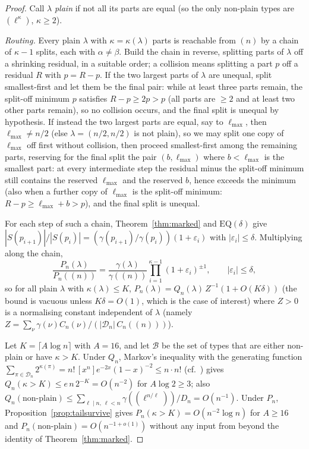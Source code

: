 \documentclass[11pt]{article}
\theoremstyle{definition}
\newcommand{\DD}{\mathcal{D}}
\newcommand{\PP}{P}
\newcommand{\QQ}{Q}
\newcommand{\CC}{C}
\begin{document}
\begin{proof}
Call $\lambda$ \emph{plain} if not all its parts are equal (so the only
non-plain types are $(\ell^{\kappa})$, $\kappa\ge2$).

\emph{Routing.}  Every plain $\lambda$ with $\kappa=\kappa(\lambda)$ parts is
reachable from $(n)$ by a chain of $\kappa-1$ splits, each with
$\alpha\ne\beta$.  Build the chain in reverse, splitting parts of $\lambda$
off a shrinking residual, in a suitable order; a collision means splitting a
part $p$ off a residual $R$ with $p=R-p$.  If the two largest parts of
$\lambda$ are unequal, split smallest-first and let them be the final pair:
while at least three parts remain, the split-off minimum $p$ satisfies
$R-p\ge2p>p$ (all parts are $\ge2$ and at least two other parts remain), so
no collision occurs, and the final split is unequal by hypothesis.  If
instead the two largest parts are equal, say to $\ell_{\max}$, then
$\ell_{\max}\neq n/2$ (else $\lambda=(n/2,n/2)$ is not plain), so we may
split one copy of $\ell_{\max}$ off first without collision, then proceed
smallest-first among the remaining parts, reserving for the final split the
pair $(b,\ell_{\max})$ where $b<\ell_{\max}$ is the smallest part: at every
intermediate step the residual minus the split-off minimum still contains
the reserved $\ell_{\max}$ and the reserved $b$, hence exceeds the
minimum (also when a further copy of $\ell_{\max}$ is the split-off
minimum: $R-p\ge\ell_{\max}+b>p$), and the final split is unequal.

For each step of such a chain, Theorem~\ref{thm:marked} and
$\mathrm{EQ}(\delta)$ give
$|S(p_{i+1})|/|S(p_i)|=(\gamma(p_{i+1})/\gamma(p_i))(1+\varepsilon_i)$ with
$|\varepsilon_i|\le\delta$.  Multiplying along the chain,
\[
\frac{\PP_n(\lambda)}{\PP_n((n))}
=\frac{\gamma(\lambda)}{\gamma((n))}\prod_{i=1}^{\kappa-1}(1+\varepsilon_i)^{\pm1},
\qquad |\varepsilon_i|\le\delta,
\]
so for all plain $\lambda$ with $\kappa(\lambda)\le K$,
$\PP_n(\lambda)=\QQ_n(\lambda)\,Z^{-1}(1+O(K\delta))$ (the bound is vacuous unless $K\delta=O(1)$, which is the case of interest) where $Z>0$ is a
normalising constant independent of $\lambda$ (namely
$Z=\sum_\nu\gamma(\nu)\CC_n(\nu)/(|\DD_n|\,\CC_n((n)))$).

Let $K=\lceil A\log n\rceil$ with $A=16$, and let
$\mathcal B$ be the set of types that are either non-plain or have
$\kappa>K$.  Under $\QQ_n$, Markov's inequality with the generating function
$\sum_{\pi\in\DD_n}2^{\kappa(\pi)}=n!\,[x^n]e^{-2x}(1-x)^{-2}\le n\cdot n!$
(cf.\ \cite[proof of Lemma~4.4]{CGW08}) gives
$\QQ_n(\kappa>K)\le e\,n\,2^{-K}=O(n^{-2})$ for $A\log2\ge3$; also
$\QQ_n(\text{non-plain})\le\sum_{\ell\mid n,\ \ell<n}
\gamma((\ell^{n/\ell}))/D_n=O(n^{-1})$.  Under $\PP_n$, Proposition~\ref{prop:tailsurvive} gives
$\PP_n(\kappa>K)=O(n^{-2}\log n)$ for $A\ge16$ and
$\PP_n(\text{non-plain})=O(n^{-1+o(1)})$ without any input from
\cite{CGW08} beyond the identity of Theorem~\ref{thm:marked}.


\end{proof}
\end{document}

